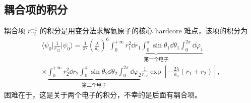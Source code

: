 \subsection{耦合项的积分}
耦合项 $r_{12}^{-1}$ 的积分是用变分法求解氦原子的核心 hardcore 难点，该项的积分为
\begin{multline}
    \bigg\langle \psi_0 \bigg| \frac1{r_{12}} \bigg| \psi_0 \bigg\rangle = \frac1{\pi^2} \left(\frac{\lambda}{a_0}\right)^6 
    \underbrace{\int_0^{+\infty} r_1^2 \dd r_1 \int_0^\pi\sin\theta_1 \dd\theta_1 \int_0^{2\pi} \dd\varphi_1}_{\text{第一个电子}} \\ \times
    \underbrace{\int_0^{+\infty} r_2^2 \dd r_2 \int_0^\pi\sin\theta_2 \dd\theta_2 \int_0^{2\pi} \dd\varphi_2}_{\text{第二个电子}} 
    \frac1{r_{12}} \exp\left[-\frac{2\lambda}{a_0}(r_1 + r_2)\right], 
\end{multline}
困难在于，这是关于两个电子的积分，不幸的是后面有耦合项。

